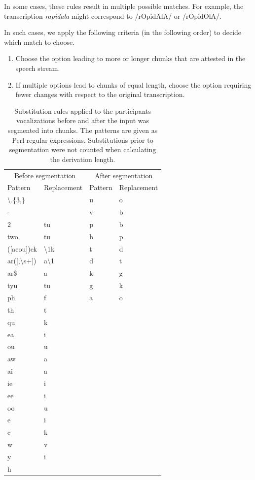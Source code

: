 \documentclass[]{article}
\providecommand{\tightlist}{%
  \setlength{\itemsep}{0pt}\setlength{\parskip}{0pt}}
\begin{document}
In some cases, these rules result in multiple possible matches. For example, the transcription \emph{rapidala} might correspond to /rOpidAlA/ or /rOpidOlA/.

In such cases, we apply the following criteria (in the following order) to decide which match to choose.

\begin{enumerate}
\def\labelenumi{\arabic{enumi}.}
\tightlist
\item
Choose the option leading to more or longer chunks that are attested in the speech stream.
\item
If multiple options lead to chunks of equal length, choose the option requiring fewer changes with respect to the original transcription.
\end{enumerate}

\begin{table}

\caption{\label{tab:recall-print-substitution-rules}Substitution rules applied to the participants vocalizations before and after the input was segmented into chunks. The patterns are given as Perl regular expressions. Substitutions prior to segmentation were not counted when calculating the derivation length.}
\centering
\begin{tabular}[t]{llll}
\toprule
\multicolumn{2}{c}{Before segmentation} & \multicolumn{2}{c}{After segmentation} \\
\cmidrule(l{3pt}r{3pt}){1-2} \cmidrule(l{3pt}r{3pt}){3-4}
Pattern & Replacement & Pattern & Replacement\\
\midrule
\textbackslash{}.\{3,\} &  & u & o\\
- &  & v & b\\
2 & tu & p & b\\
two & tu & b & p\\
([aeou])ck & \textbackslash{}1k & t & d\\
\addlinespace
ar([,\textbackslash{}s+]) & a\textbackslash{}1 & d & t\\
ar\$ & a & k & g\\
tyu & tu & g & k\\
ph & f & a & o\\
th & t &  & \\
\addlinespace
qu & k &  & \\
ea & i &  & \\
ou & u &  & \\
aw & a &  & \\
ai & a &  & \\
\addlinespace
ie & i &  & \\
ee & i &  & \\
oo & u &  & \\
e & i &  & \\
c & k &  & \\
\addlinespace
w & v &  & \\
y & i &  & \\
h &  &  & \\
\bottomrule
\end{tabular}
\end{table}
\end{document}
